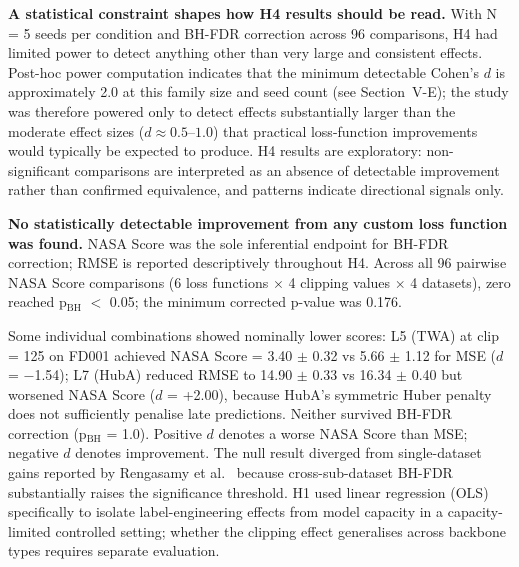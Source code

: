 \documentclass[preprint,10pt]{elsarticle}
\begin{document}
\textbf{A statistical constraint shapes how H4 results should be read.} With N = 5 seeds per condition and BH-FDR correction across 96 comparisons, H4 had limited power to detect anything other than very large and consistent effects. Post-hoc power computation indicates that the minimum detectable Cohen's $d$ is approximately 2.0 at this family size and seed count (see Section~V-E); the study was therefore powered only to detect effects substantially larger than the moderate effect sizes ($d \approx 0.5$--$1.0$) that practical loss-function improvements would typically be expected to produce. H4 results are exploratory: non-significant comparisons are interpreted as an absence of detectable improvement rather than confirmed equivalence, and patterns indicate directional signals only.

\textbf{No statistically detectable improvement from any custom loss function was found.} NASA Score was the sole inferential endpoint for BH-FDR correction; RMSE is reported descriptively throughout H4. Across all 96 pairwise NASA Score comparisons (6 loss functions $\times$ 4 clipping values $\times$ 4 datasets), zero reached p$_\text{BH}$ $<$ 0.05; the minimum corrected p-value was 0.176.

Some individual combinations showed nominally lower scores: L5 (TWA) at clip = 125 on FD001 achieved NASA Score = 3.40 $\pm$ 0.32 vs 5.66 $\pm$ 1.12 for MSE ($d$ = $-$1.54); L7 (HubA) reduced RMSE to 14.90 $\pm$ 0.33 vs 16.34 $\pm$ 0.40 but worsened NASA Score ($d$ = +2.00), because HubA's symmetric Huber penalty does not sufficiently penalise late predictions. Neither survived BH-FDR correction (p$_\text{BH}$ = 1.0). Positive $d$ denotes a worse NASA Score than MSE; negative $d$ denotes improvement. The null result diverged from single-dataset gains reported by Rengasamy et al.\ \cite{ref37,ref39} because cross-sub-dataset BH-FDR substantially raises the significance threshold. H1 used linear regression (OLS) specifically to isolate label-engineering effects from model capacity in a capacity-limited controlled setting; whether the clipping effect generalises across backbone types requires separate evaluation.
\end{document}
